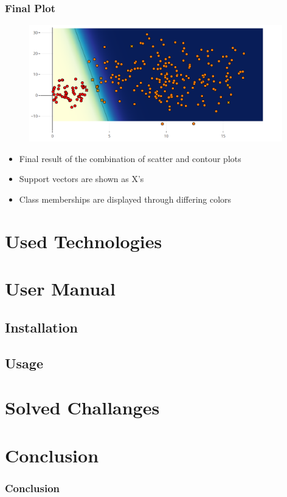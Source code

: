 \documentclass[english,hangout]{beamer}
\begin{document}
\begin{frame}
	\frametitle{Final Plot}
	\begin{figure}
		\centering
		\includegraphics[width=11cm]{FinalPlot.png}
	\end{figure}
	\begin{itemize}
		\item Final result of the combination of scatter and contour plots
		\item Support vectors are shown as X's
		\item Class memberships are displayed through differing colors
	\end{itemize}
\end{frame}

\section{Used Technologies}

\section{User Manual}

\subsection{Installation}

\subsection{Usage}

\section{Solved Challanges}

\section{Conclusion}
\begin{frame}
	\frametitle{Conclusion}

\end{frame}
\end{document}
